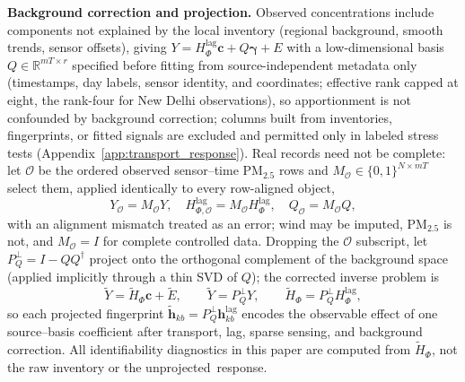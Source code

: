 \noindent\textbf{Background correction and projection.}\label{subsec:background_construction}
Observed concentrations include components not explained by the local inventory
(regional background, smooth trends, sensor offsets), giving
\(Y = H_{\Phi}^{\mathrm{lag}}\mathbf c + Q\boldsymbol\gamma + E\) with a
low-dimensional basis \(Q\in \mathbb R^{mT\times r}\) specified before fitting from
source-independent metadata only (timestamps, day labels, sensor identity, and
coordinates; effective rank capped at eight, the rank-four for New Delhi observations),
so apportionment is not confounded by background correction; columns built from
inventories, fingerprints, or fitted signals are excluded and permitted only in
labeled stress tests (Appendix~\ref{app:transport_response}).  Real records need
not be complete: let \(\mathcal O\) be the ordered observed sensor--time
PM\(_{2.5}\) rows and \(M_{\mathcal O}\in\{0,1\}^{N\times mT}\) select them, applied
identically to every row-aligned object,
\begin{equation}
Y_{\mathcal O}=M_{\mathcal O}Y,\quad
H_{\Phi,\mathcal O}^{\mathrm{lag}}
=M_{\mathcal O}H_{\Phi}^{\mathrm{lag}},\quad
Q_{\mathcal O}=M_{\mathcal O}Q,
\label{eq:observation_selection}
\end{equation}
with an alignment mismatch treated as an error;
wind may be imputed, PM\(_{2.5}\) is not, and \(M_{\mathcal O}=I\) for complete
controlled data.  Dropping the \(\mathcal O\) subscript, let
\(P_Q^\perp = I - QQ^\dagger\) project onto the orthogonal complement of the
background space (applied implicitly through a thin SVD of \(Q\)); the corrected
inverse problem is
\begin{equation}
\widetilde Y = \widetilde H_\Phi\mathbf c + \widetilde E,
\qquad
\widetilde Y=P_Q^\perp Y,
\qquad
\widetilde H_\Phi=P_Q^\perp H_{\Phi}^{\mathrm{lag}},
\label{eq:projected_model}
\end{equation}
so each projected fingerprint
\(\widetilde{\mathbf h}_{kb}=P_Q^\perp\mathbf h_{kb}^{\mathrm{lag}}\) encodes the
observable effect of one source--basis coefficient after transport, lag, sparse
sensing, and background correction.  All identifiability diagnostics in this paper
are computed from \(\widetilde H_\Phi\), not the raw inventory or the
\mbox{unprojected response}.

